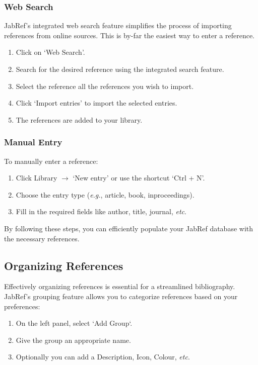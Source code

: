 			\subsubsection{Web Search}
				JabRef's integrated web search feature simplifies the process of importing references from online sources.
				This is by-far the easiest way to enter a reference.
				
				\begin{enumerate}
					\item Click on `Web Search'.
					\item Search for the desired reference using the integrated search feature.
					\item Select the reference all the references you wish to import.
					\item Click `Import entries' to import the selected entries.
					\item The references are added to your library.
				\end{enumerate}
				
			\subsubsection{Manual Entry}
				To manually enter a reference:

				\begin{enumerate}
					\item Click Library $\rightarrow$ `New entry' or use the shortcut `Ctrl + N'.
					\item Choose the entry type (\textit{e.g.}, article, book, inproceedings).
					\item Fill in the required fields like author, title, journal, \textit{etc}.
				\end{enumerate}
				

				By following these steps, you can efficiently populate your JabRef database with the necessary references.

		\subsection{Organizing References}
			Effectively organizing references is essential for a streamlined bibliography. 
			JabRef's grouping feature allows you to categorize references based on your preferences:
			\begin{enumerate}
				\item On the left panel, select `Add Group`.
				\item Give the group an appropriate name.
				\item Optionally you can add a Description, Icon, Colour, \textit{etc}.
			\end{enumerate}
			
